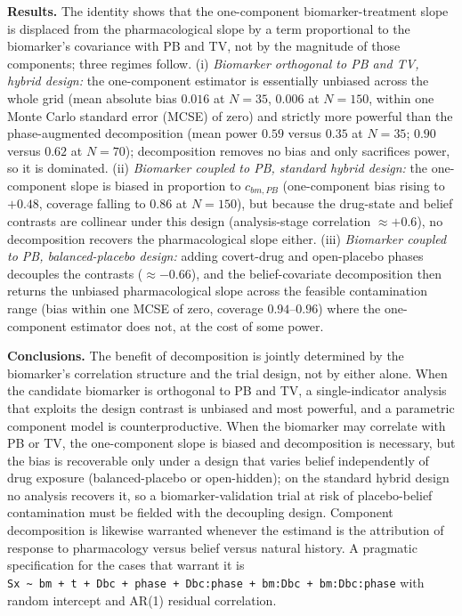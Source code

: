 \documentclass[
  11pt,
]{article}
\begin{document}
\textbf{Results.} The identity shows that the one-component
biomarker-treatment slope is displaced from the pharmacological
slope by a term proportional to the biomarker's covariance with PB
and TV, not by the magnitude of those components; three regimes
follow. (i) \emph{Biomarker orthogonal to PB and TV, hybrid design:} the
one-component estimator is essentially unbiased across the whole
grid (mean absolute bias \(0.016\) at \(N=35\), \(0.006\) at \(N=150\),
within one Monte Carlo standard error (MCSE) of zero) and strictly more
powerful than the phase-augmented decomposition (mean power \(0.59\)
versus \(0.35\) at \(N=35\); \(0.90\) versus \(0.62\) at \(N=70\));
decomposition removes no bias and only sacrifices power, so it is
dominated. (ii) \emph{Biomarker coupled to PB, standard hybrid design:}
the one-component slope is biased in proportion to \(c_{bm,PB}\)
(one-component bias rising to \(+0.48\), coverage falling to \(0.86\) at
\(N=150\)), but because the drug-state and belief contrasts are
collinear under this design (analysis-stage correlation
\(\approx +0.6\)), no decomposition recovers the pharmacological slope
either. (iii) \emph{Biomarker coupled to PB, balanced-placebo design:}
adding covert-drug and open-placebo phases decouples the contrasts
(\(\approx -0.66\)), and the belief-covariate decomposition then
returns the unbiased pharmacological slope across the feasible
contamination range (bias within one MCSE of zero,
coverage \(0.94\)--\(0.96\)) where the one-component estimator does not,
at the cost of some power.

\textbf{Conclusions.} The benefit of decomposition is jointly determined
by the biomarker's correlation structure and the trial design, not
by either alone. When the candidate biomarker is orthogonal to PB
and TV, a single-indicator analysis that exploits the design
contrast is unbiased and most powerful, and a parametric component
model is counterproductive. When the biomarker may correlate with PB
or TV, the one-component slope is biased and decomposition is necessary, but
the bias is recoverable only under a design that varies belief
independently of drug exposure (balanced-placebo or open-hidden); on
the standard hybrid design no analysis recovers it, so a
biomarker-validation trial at risk of placebo-belief contamination
must be fielded with the decoupling design. Component decomposition
is likewise warranted whenever the estimand is the attribution of
response to pharmacology versus belief versus natural history. A
pragmatic specification for the cases that warrant it is
\texttt{Sx\ \textasciitilde{}\ bm\ +\ t\ +\ Dbc\ +\ phase\ +\ Dbc:phase\ +\ bm:Dbc\ +\ bm:Dbc:phase}
with random intercept and AR(1) residual correlation.
\end{document}
